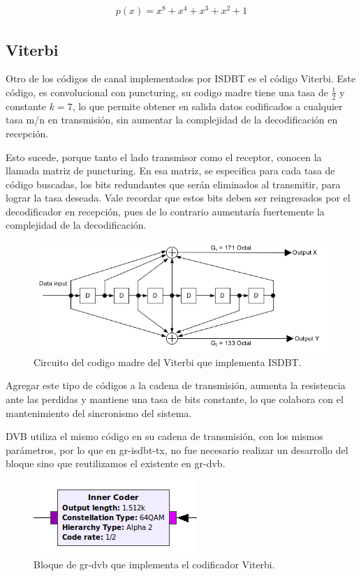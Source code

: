 \begin{gather*}
	p(x) = x^8 + x^4 + x^3 + x^2 + 1
\end{gather*}

	\subsection{Viterbi}
	Otro de los códigos de canal implementados por ISDBT es el código Viterbi. Este código, es  convolucional con puncturing, su codigo madre tiene una tasa de $\frac{1}{2}$ y constante $k = 7$, lo que permite obtener en salida datos codificados a cualquier tasa m/n en transmisión, sin aumentar la complejidad de la decodificación en recepción. 
	
	Esto sucede, porque tanto el lado transmisor como el receptor, conocen la llamada matriz de puncturing. En esa matriz, se especifica para cada tasa de código buscadas, los bits redundantes que serán eliminados al transmitir, para lograr la tasa deseada. Vale recordar que estos bits deben ser reingresados por el decodificador en recepción, pues de lo contrario aumentaría fuertemente la complejidad de la decodificación.
	
	\begin{figure}[h!]
		\centering
		\includegraphics[scale=0.5]{figuras/cap05/viterbi}
		\caption{\label{f:viterbi} Circuito del codigo madre del Viterbi que implementa ISDBT.}
	\end{figure}
	
	Agregar este tipo de códigos a la cadena de transmisión, aumenta la resistencia ante las perdidas y mantiene una tasa de bits constante, lo que colabora con el mantenimiento del sincronismo del sistema.
	
	DVB utiliza el mismo código en su cadena de transmisión, con los mismos parámetros, por lo que en gr-isdbt-tx, no fue necesario realizar un desarrollo del bloque sino que reutilizamos el existente en gr-dvb. 
	
	\begin{figure}[h!]
		\centering
		\includegraphics[scale=0.5]{figuras/cap05/inner}
		\caption{\label{f:inner} Bloque de gr-dvb que implementa el codificador Viterbi.}
	\end{figure}
	
